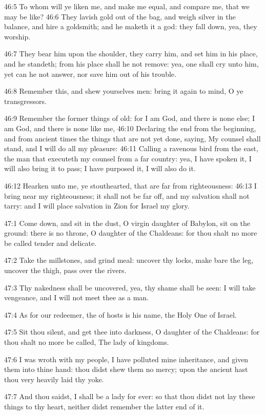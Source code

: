46:5 To whom will ye liken me, and make me equal, and compare me, that we may be like?  46:6 They lavish gold out of the bag, and weigh silver in the balance, and hire a goldsmith; and he maketh it a god: they fall down, yea, they worship.

46:7 They bear him upon the shoulder, they carry him, and set him in his place, and he standeth; from his place shall he not remove: yea, one shall cry unto him, yet can he not answer, nor save him out of his trouble.

46:8 Remember this, and shew yourselves men: bring it again to mind, O ye transgressors.

46:9 Remember the former things of old: for I am God, and there is none else; I am God, and there is none like me, 46:10 Declaring the end from the beginning, and from ancient times the things that are not yet done, saying, My counsel shall stand, and I will do all my pleasure: 46:11 Calling a ravenous bird from the east, the man that executeth my counsel from a far country: yea, I have spoken it, I will also bring it to pass; I have purposed it, I will also do it.

46:12 Hearken unto me, ye stouthearted, that are far from righteousness: 46:13 I bring near my righteousness; it shall not be far off, and my salvation shall not tarry: and I will place salvation in Zion for Israel my glory.

47:1 Come down, and sit in the dust, O virgin daughter of Babylon, sit on the ground: there is no throne, O daughter of the Chaldeans: for thou shalt no more be called tender and delicate.

47:2 Take the millstones, and grind meal: uncover thy locks, make bare the leg, uncover the thigh, pass over the rivers.

47:3 Thy nakedness shall be uncovered, yea, thy shame shall be seen: I will take vengeance, and I will not meet thee as a man.

47:4 As for our redeemer, the \LORD of hosts is his name, the Holy One of Israel.

47:5 Sit thou silent, and get thee into darkness, O daughter of the Chaldeans: for thou shalt no more be called, The lady of kingdoms.

47:6 I was wroth with my people, I have polluted mine inheritance, and given them into thine hand: thou didst shew them no mercy; upon the ancient hast thou very heavily laid thy yoke.

47:7 And thou saidst, I shall be a lady for ever: so that thou didst not lay these things to thy heart, neither didst remember the latter end of it.

